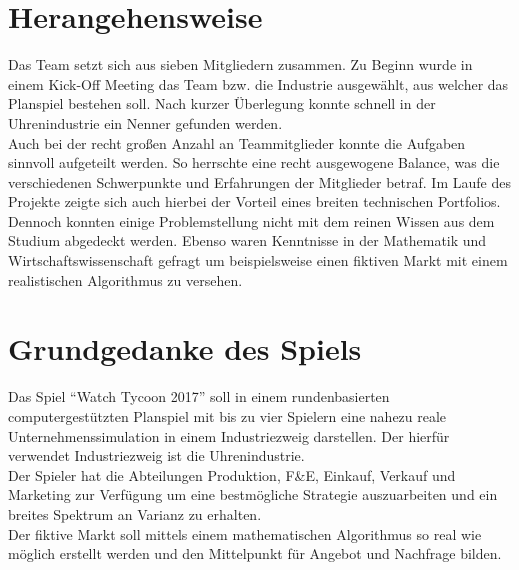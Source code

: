 \section{Herangehensweise}
Das Team setzt sich aus sieben Mitgliedern zusammen. Zu Beginn wurde in einem Kick-Off Meeting das Team bzw. die Industrie ausgewählt, aus welcher das Planspiel bestehen soll. Nach kurzer Überlegung konnte schnell in der Uhrenindustrie ein Nenner gefunden werden. \\
Auch bei der recht großen Anzahl an Teammitglieder konnte die Aufgaben sinnvoll aufgeteilt werden. So herrschte eine recht ausgewogene Balance, was die verschiedenen Schwerpunkte und Erfahrungen der Mitglieder betraf. Im Laufe des Projekte zeigte sich auch hierbei der Vorteil eines breiten technischen Portfolios. Dennoch konnten einige Problemstellung nicht mit dem reinen Wissen aus dem Studium abgedeckt werden. Ebenso waren Kenntnisse in der Mathematik und Wirtschaftswissenschaft gefragt um beispielsweise einen fiktiven Markt mit einem realistischen Algorithmus zu versehen.      

\section{Grundgedanke des Spiels}
Das Spiel \enquote{Watch Tycoon 2017} soll in einem rundenbasierten computergestützten Planspiel mit bis zu vier Spielern eine nahezu reale Unternehmenssimulation in einem Industriezweig darstellen. Der hierfür verwendet Industriezweig ist die Uhrenindustrie.\\
Der Spieler hat die Abteilungen Produktion, F\&E, Einkauf, Verkauf und Marketing zur Verfügung um eine bestmögliche Strategie auszuarbeiten und ein breites Spektrum an Varianz zu erhalten.\\
Der fiktive Markt soll mittels einem mathematischen Algorithmus so real wie möglich erstellt werden und den Mittelpunkt für Angebot und Nachfrage bilden.














